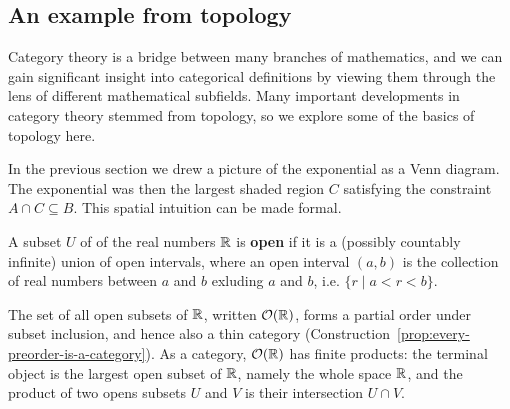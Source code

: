 
\subsection{An example from topology}
Category theory is a bridge between many branches of mathematics, and we 
can gain significant insight into categorical definitions by viewing them 
through the lens of different mathematical subfields. Many important 
developments in category theory stemmed from topology, so we explore 
some of the basics of topology here.

In the previous section we drew a picture of the exponential as a Venn diagram.  The
exponential was then the largest shaded region \(C\) satisfying the constraint
\(A \cap C \subseteq B\).  This spatial intuition can be made formal.

\begin{definition}
  \sloppy
  A subset \(U\) of of the real numbers \(\mathbb R\) is \textbf{open}
  if it is a (possibly countably infinite) union of open intervals, where an open interval 
  $(a, b)$ is the collection of real numbers between $a$ and $b$
  exluding $a$ and $b$, i.e.  $\{r \mid a < r < b\}$.
\end{definition}

The set of all open subsets of \(\mathbb R\), written \(\mathcal O(\mathbb R)\),
forms a partial order under subset inclusion,
and hence also a thin category (Construction~\ref{prop:every-preorder-is-a-category}).
As a category, \(\mathcal O(\mathbb R)\) has finite products:
the terminal object is the largest open subset of \(\mathbb R\),
namely the whole space \(\mathbb R\),
and the product of two opens subsets \(U\) and \(V\)
is their intersection \(U\cap V\).

